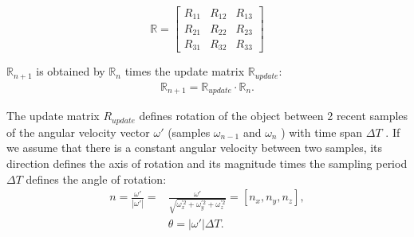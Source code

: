 \documentclass[10pt, conference, letterpaper]{IEEEtran}
\begin{document}
\begin{equation}
\mathbb{R} = {
\left[ \begin{array}{ccc}
R_{11} & R_{12} & R_{13}\\
R_{21} & R_{22} & R_{23}\\
R_{31} & R_{32} & R_{33}
\end{array}
\right ]}
\end{equation}

$\mathbb{R}_{n+1}$ is obtained by $\mathbb{R}_{n}$ times the update matrix $\mathbb{R}_{update}$:
\begin{equation}
\label{R_n+1}
\begin{aligned}
 \mathbb{R}_{n+1} = \mathbb{R}_{update}\cdot \mathbb{R}_{n}.
\end{aligned}
\end{equation}

The update matrix $R_{update}$ defines rotation of the object between 2 recent samples of the angular velocity vector $\omega'$ (samples $\omega_{n-1}$ and $\omega_{n}$ ) with time span $\Delta T$ . If we assume that there is a constant angular velocity between two samples, its direction defines the axis of rotation and its magnitude times the sampling period $\Delta T$ defines the angle of rotation:
\begin{equation}
\label{R_n+1}
\begin{aligned}
 n=\frac{\omega'}{|\omega'|}=&\frac{\omega'}{\sqrt{\omega_{x}^{'2}+\omega_{y}^{'2}+\omega_{z}^{'2}}}=[n_{x}, n_{y}, n_{z}],\\
 &\theta = |\omega'|\Delta T.
\end{aligned}
\end{equation}
\end{document}
